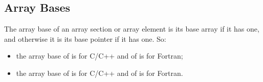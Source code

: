 
\subsection{Array Bases}

The array base of an array section or array element is its base array if it has
one, and otherwise it is its base pointer if it has one. So:

\begin{itemize}
\item the array base of  is  for C/C++ and 
      of  is  for Fortran;

\item the array base of  is  for C/C++ and 
      of  is  for Fortran.
\end{itemize}

